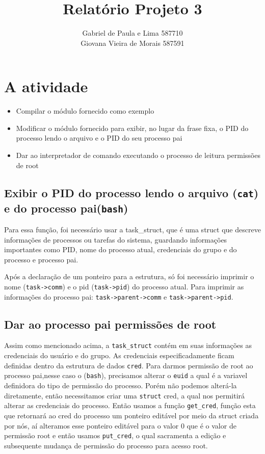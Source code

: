 \documentclass[12pt]{article}
\author{Gabriel de Paula e Lima  587710\\
        Giovana Vieira de Morais  587591}
\title{Relatório Projeto 3}
\begin{document}
\maketitle
\newpage

\section*{A atividade}

\begin{itemize}
    \item{Compilar o módulo fornecido como exemplo}
    \item{Modificar o módulo fornecido para exibir, no lugar da frase fixa,
    o PID do processo lendo o arquivo e o PID do seu processo pai}
    \item{Dar ao interpretador de comando executando o processo de leitura
        permissões de root}
\end{itemize}

\subsection*{Exibir o PID do processo lendo o arquivo (\texttt{cat}) e do
processo pai(\texttt{bash})}
    Para essa função, foi necessário usar a task\_struct, que é uma struct que
    descreve informações de processos ou tarefas do sistema, guardando
    informações importantes como PID, nome do processo atual, credenciais do
    grupo e do processo e processo pai.

    Após a declaração de um ponteiro para a estrutura, só foi necessário
    imprimir o nome (\texttt{task->comm}) e o pid (\texttt{task->pid}) do
    processo atual. Para imprimir as informações do processo pai:
    \texttt{task->parent->comm} e \texttt{task->parent->pid}.
\subsection*{Dar ao processo pai permissões de root}
    Assim como mencionado acima, a \texttt{task\_struct} contém em suas
    informações as credenciais do usuário e do grupo. As credenciais
    especificadamente ficam definidas dentro da estrutura de dados \texttt{cred}.
    Para darmos permissão de root ao processo pai,nesse caso o (\texttt{bash}),
    precisamos alterar o \texttt{euid} a qual é a variavel definidora do
    tipo de permissão do processo. Porém não podemos alterá-la diretamente,
    então necessitamos criar uma \texttt{struct} cred, a qual nos permitirá
    alterar as credenciais do processo. Então usamos a função \texttt{get\_cred},
    função esta que retornará ao cred do processo um ponteiro editável
    por meio da struct criada por nós, aí alteramos esse ponteiro editável
    para o valor 0 que é o valor de permissão root e então usamos \texttt{put\_cred},
    o qual sacramenta a edição e subsequente mudança de permissão do processo para acesso root.
\end{document}
